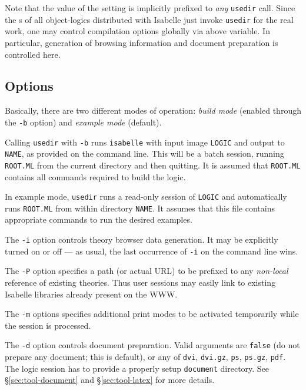 Note that the value of the  setting is
implicitly prefixed to \emph{any} \texttt{usedir} call. Since the
s of all object-logics distributed with Isabelle just
invoke \texttt{usedir} for the real work, one may control compilation options
globally via above variable. In particular, generation of 
browsing information and document preparation is controlled here.


\subsection*{Options}

Basically, there are two different modes of operation: \emph{build mode}
(enabled through the \texttt{-b} option) and \emph{example mode} (default).

Calling \texttt{usedir} with \texttt{-b} runs \texttt{isabelle} with input
image \texttt{LOGIC} and output to \texttt{NAME}, as provided on the command
line. This will be a batch session, running \texttt{ROOT.ML} from the current
directory and then quitting.  It is assumed that \texttt{ROOT.ML} contains all
{\ML} commands required to build the logic.

In example mode, \texttt{usedir} runs a read-only session of \texttt{LOGIC}
and automatically runs \texttt{ROOT.ML} from within directory \texttt{NAME}.
It assumes that this file contains appropriate {\ML} commands to run the
desired examples.

\medskip The \texttt{-i} option controls theory browser data generation. It
may be explicitly turned on or off --- as usual, the last occurrence of
\texttt{-i} on the command line wins.

The \texttt{-P} option specifies a path (or actual URL) to be prefixed to any
\emph{non-local} reference of existing theories.  Thus user sessions may
easily link to existing Isabelle libraries already present on the WWW.

The \texttt{-m} options specifies additional print modes to be activated
temporarily while the session is processed.

\medskip The \texttt{-d} option controls document preparation.  Valid
arguments are \texttt{false} (do not prepare any document; this is default),
or any of \texttt{dvi}, \texttt{dvi.gz}, \texttt{ps}, \texttt{ps.gz},
\texttt{pdf}.  The logic session has to provide a properly setup
\texttt{document} directory.  See \S\ref{sec:tool-document} and
\S\ref{sec:tool-latex} for more details.

